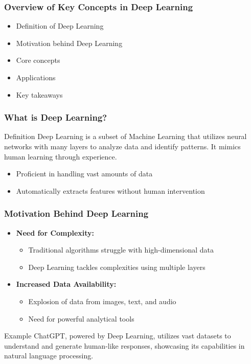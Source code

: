 \documentclass[aspectratio=169]{beamer}
\begin{document}
\begin{frame}[fragile]
    \frametitle{Overview of Key Concepts in Deep Learning}
    \begin{itemize}
        \item Definition of Deep Learning
        \item Motivation behind Deep Learning
        \item Core concepts
        \item Applications
        \item Key takeaways
    \end{itemize}
\end{frame}

\begin{frame}[fragile]
    \frametitle{What is Deep Learning?}
    \begin{block}{Definition}
        Deep Learning is a subset of Machine Learning that utilizes neural networks with many layers to analyze data and identify patterns. It mimics human learning through experience.
    \end{block}
    \begin{itemize}
        \item Proficient in handling vast amounts of data
        \item Automatically extracts features without human intervention
    \end{itemize}
\end{frame}

\begin{frame}[fragile]
    \frametitle{Motivation Behind Deep Learning}
    \begin{itemize}
        \item \textbf{Need for Complexity:} 
        \begin{itemize}
            \item Traditional algorithms struggle with high-dimensional data
            \item Deep Learning tackles complexities using multiple layers
        \end{itemize}
        \item \textbf{Increased Data Availability:} 
        \begin{itemize}
            \item Explosion of data from images, text, and audio
            \item Need for powerful analytical tools
        \end{itemize}
    \end{itemize}
    \begin{block}{Example}
        ChatGPT, powered by Deep Learning, utilizes vast datasets to understand and generate human-like responses, showcasing its capabilities in natural language processing.
    \end{block}
\end{frame}
\end{document}
